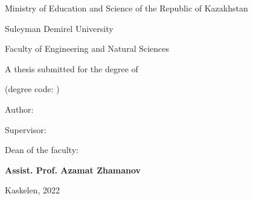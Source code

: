 \newpage
\pagestyle{empty}

\begin{center}
\large
Ministry of Education and Science of the Republic of Kazakhstan

Suleyman Demirel University

Faculty of Engineering and Natural Sciences

\vspace{2cm}
\textbf{\mytitle}

\vspace{1cm}
\large
A thesis submitted for the degree of

\mydegree

(degree code: \mydegreecode)

\vspace{2cm}
Author: \textbf{\myauthor}

\vspace{2cm}
Supervisor: \textbf{\mycoach}

\vspace{2cm}
Dean of the faculty:

\textbf{Assist. Prof. Azamat Zhamanov}


\vfill
Kaskelen, 2022
\end{center}